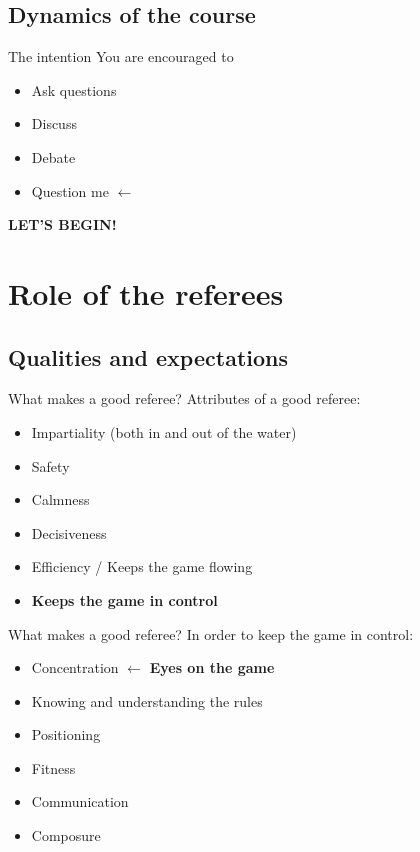 \documentclass{beamer}
\begin{document}
    \subsection{Dynamics of the course}
    \begin{frame}{The intention}
        You are encouraged to
        \begin{itemize}
            \item Ask questions
            \item Discuss
            \item Debate
            \item Question me $\leftarrow$
        \end{itemize}

        \pause

        \begin{center}
            \textbf{\uppercase{Let's begin!}}
        \end{center}
    \end{frame}

    \section{Role of the referees}

    \subsection{Qualities and expectations}

    \begin{frame}{What makes a good referee?}
        Attributes of a good referee: \pause
        \begin{itemize}
            \item Impartiality (both in and out of the water) \pause
            \item Safety \pause
            \item Calmness \pause
            \item Decisiveness \pause
            \item Efficiency / Keeps the game flowing \pause
            \item \textbf{Keeps the game in control}
        \end{itemize}
    \end{frame}

    \begin{frame}{What makes a good referee?}
        In order to keep the game in control:
        \begin{itemize}
            \item Concentration \pause $\leftarrow$ \textbf{Eyes on the game} \pause
            \item Knowing and understanding the rules \pause
            \item Positioning \pause
            \item Fitness \pause
            \item Communication \pause
            \item Composure
        \end{itemize}
    \end{frame}
\end{document}
